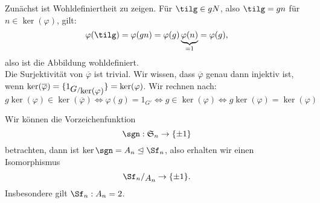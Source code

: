 \begin{beweis}
Zunächst ist Wohldefiniertheit zu zeigen. Für $\tilg \in gN$, also $\tilg = gn$ für $n \in \ker (\varphi)$, gilt:
\begin{equation}
\varphi( \tilg) = \varphi(gn) = \varphi(g)\underbrace{\varphi(n)}_{=1} = \varphi(g),
\end{equation}
also ist die Abbildung wohldefiniert.\\
Die Surjektivität von $\overline{\varphi}$ ist trivial. Wir wissen, dass $\overline{\varphi}$ genau dann injektiv ist, wenn $\ker (\overline{\varphi}) = \{1_{\quotient{G}{\ker (\varphi) }}\} = \ker (\varphi)$. Wir rechnen nach:
\begin{equation}
g \ker (\varphi) \in \ker (\overline{\varphi}) \iff \varphi(g) = 1_{G'} \iff g \in \ker (\varphi) \iff g \ker (\varphi) = \ker (\varphi)
\end{equation}
\end{beweis}
\begin{beispiel}
Wir können die Vorzeichenfunktion 
\begin{equation}
\sgn: \mathfrak{S}_n \to \{\pm 1\}
\end{equation}
betrachten, dann ist $\ker{\sgn} = A_n \trianglelefteq \Sf_n$, also erhalten wir einen Isomorphismus 
\begin{equation}
\quotient{\Sf_n}{A_n} \to \{ \pm 1\}.
\end{equation}
Insbesondere gilt $\Sf_n : A_n = 2$.
\end{beispiel}

